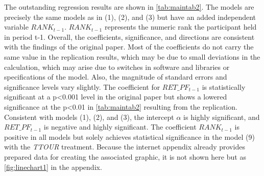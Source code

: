 \documentclass[12pt]{article}
\begin{document}
The outstanding regression results are shown in \autoref{tab:maintab2}. The models are precisely the same models as in (1), (2), and (3) but have an added independent variable \textit{$RANK_{t-1}$}. \textit{$RANK_{t-1}$} represents the numeric rank the participant held in period t-1. Overall, the coefficients, significance, and directions are consistent with the findings of the original paper. Most of the coefficients do not carry the same value in the replication results, which may be due to small deviations in the calculation, which may arise due to switches in software and libraries or specifications of the model. Also, the magnitude of standard errors and significance levels vary slightly. The coefficient for \textit{$RET\_PF_{t-1}$} is statistically significant at a p\textless0.001 level in the original paper but shows a lowered significance at the p\textless0.01 in \autoref{tab:maintab2} resulting from the replication. Consistent with models (1), (2), and (3), the intercept $\alpha$ is highly significant, and \textit{$RET\_PF_{t-1}$} is negative and highly significant. The coefficient \textit{$RANK_{t-1}$} is positive in all models but solely achieves statistical significance in the model (9) with the \textit{TTOUR} treatment. Because the internet appendix already provides prepared data for creating the associated graphic, it is not shown here but as \autoref{fig:linechart1} in the appendix.
\end{document}

